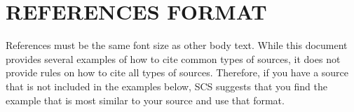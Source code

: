\documentclass{scsPaperFormattingTemplate-LaTex-Revised20160302}
\begin{document}
%
%
%
%

\section*{REFERENCES FORMAT}
References must be the same font size as other body text. While this document provides several examples of how to cite common types of sources, it does not provide rules on how to cite all types of sources. Therefore, if you have a source that is not included in the examples below, SCS suggests that you find the example that is most similar to your source and use that format.



\end{document}
